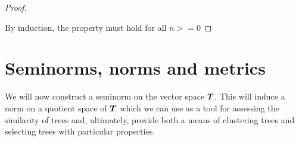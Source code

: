 \begin{proposition}
\begin{proof}
\begin{description}
      



    \end{description}
    By induction, the property must hold for all \(n >= 0\)
  \end{proof}
\end{proposition}



\section{Seminorms, norms and metrics} %
We will now construct a seminorm on the vector space $\boldsymbol{T}$. This will induce a norm on a quotient space of $\boldsymbol{T}$ which
we can use as a tool for assessing the similarity of trees and, ultimately, provide both a means of clustering trees and
selecting trees with particular properties.

